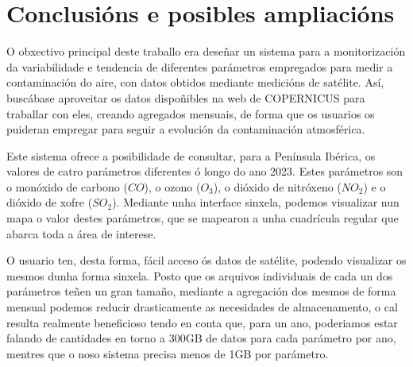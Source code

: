 \chapter{Conclusións e posibles ampliacións}
O obxectivo principal deste traballo era deseñar un sistema para a monitorización da variabilidade e tendencia de diferentes parámetros empregados para medir a contaminación do aire, con datos
obtidos mediante medicións de satélite. Así, buscábase aproveitar os datos dispoñibles na web de COPERNICUS para traballar con eles, creando agregados mensuais, de forma que os usuarios os puideran
empregar para seguir a evolución da contaminación atmosférica.

Este sistema ofrece a posibilidade de consultar, para a Península Ibérica, os valores de catro parámetros diferentes ó longo do ano 2023. Estes parámetros son o monóxido de carbono ($CO$), o ozono
($O_3$), o dióxido de nitróxeno ($NO_2$) e o dióxido de xofre ($SO_2$). Mediante unha interface sinxela, podemos visualizar nun mapa o valor destes parámetros, que se mapearon a unha cuadrícula
regular que abarca toda a área de interese.

O usuario ten, desta forma, fácil acceso ós datos de satélite, podendo visualizar os mesmos dunha forma sinxela. Posto que os arquivos individuais de cada un dos parámetros teñen un gran tamaño,
mediante a agregación dos mesmos de forma mensual podemos reducir drasticamente as necesidades de almacenamento, o cal resulta realmente beneficioso tendo en conta que, para un ano, poderiamos
estar falando de cantidades en torno a 300GB de datos para cada parámetro por ano, mentres que o noso sistema precisa menos de 1GB por parámetro.

